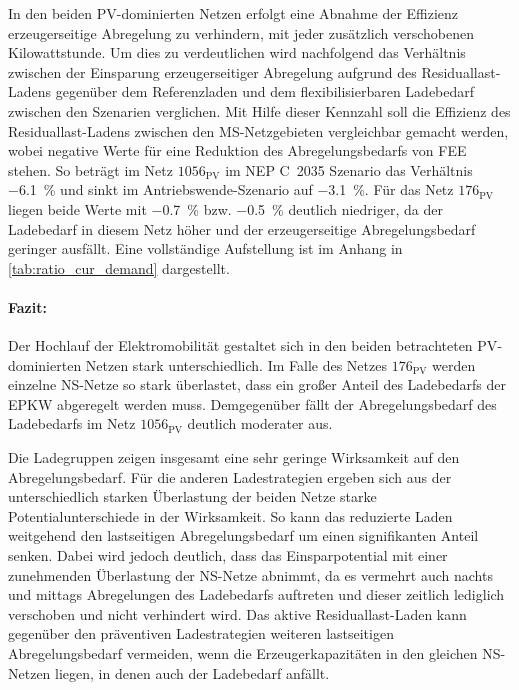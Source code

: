 

In den beiden \gls{PV}-dominierten Netzen erfolgt eine Abnahme der Effizienz erzeugerseitige Abregelung zu verhindern, mit jeder zusätzlich verschobenen Kilowattstunde.
Um dies zu verdeutlichen wird nachfolgend das Verhältnis zwischen der Einsparung erzeugerseitiger Abregelung aufgrund des Residuallast-Ladens gegenüber dem Referenzladen und dem flexibilisierbaren Ladebedarf zwischen den Szenarien verglichen.
Mit Hilfe dieser Kennzahl soll die Effizienz des Residuallast-Ladens zwischen den \gls{MS}-Netzgebieten vergleichbar gemacht werden, wobei negative Werte für eine Reduktion des Abregelungsbedarfs von \gls{FEE} stehen.
So beträgt im Netz \(1056_{\text{PV}}\) im \gls{NEP} C~\num{2035} Szenario das Verhältnis \SI{-6.1}{\percent} und sinkt im Antriebswende-Szenario auf \SI{-3.1}{\percent}.
Für das Netz \(176_{\text{PV}}\) liegen beide Werte mit \SI{-0.7}{\percent} bzw. \SI{-0.5}{\percent} deutlich niedriger, da der Ladebedarf in diesem Netz höher und der erzeugerseitige Abregelungsbedarf geringer ausfällt.
Eine vollständige Aufstellung ist im Anhang in \autoref{tab:ratio_cur_demand} dargestellt.


\paragraph{Fazit:}

Der Hochlauf der Elektromobilität gestaltet sich in den beiden betrachteten \gls{PV}-dominierten Netzen stark unterschiedlich.
Im Falle des Netzes \(176_{\text{PV}}\) werden einzelne \gls{NS}-Netze so stark überlastet, dass ein großer Anteil des Ladebedarfs der \gls{EPKW} abgeregelt werden muss.
Demgegenüber fällt der Abregelungsbedarf des Ladebedarfs im Netz \(1056_{\text{PV}}\) deutlich moderater aus. \medskip

Die Ladegruppen zeigen insgesamt eine sehr geringe Wirksamkeit auf den Abregelungsbedarf.
Für die anderen Ladestrategien ergeben sich aus der unterschiedlich starken Überlastung der beiden Netze starke Potentialunterschiede in der Wirksamkeit.
So kann das reduzierte Laden weitgehend den lastseitigen Abregelungsbedarf um einen signifikanten Anteil senken.
Dabei wird jedoch deutlich, dass das Einsparpotential mit einer zunehmenden Überlastung der \gls{NS}-Netze abnimmt, da es vermehrt auch nachts und mittags Abregelungen des Ladebedarfs auftreten und dieser zeitlich lediglich verschoben und nicht verhindert wird.
Das aktive Residuallast-Laden kann gegenüber den präventiven Ladestrategien weiteren lastseitigen Abregelungsbedarf vermeiden, wenn die Erzeugerkapazitäten in den gleichen \gls{NS}-Netzen liegen, in denen auch der Ladebedarf anfällt.\medskip

